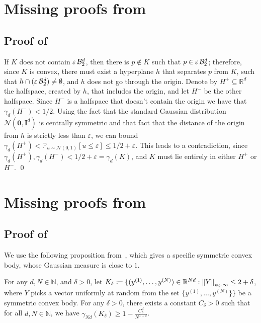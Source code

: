 \section{Missing proofs from }\label{app: missing from prelims}

\subsection{Proof of~}
    If $K$ does not contain $\varepsilon \, \mathcal{B}^d_2$, then there is $p \notin K$ such that $p \in \varepsilon \, \mathcal{B}^d_2$; therefore, since $K$ is convex, there must exist a hyperplane $h$ that separates $p$ from $K$, such that $h \cap (\varepsilon \, \mathcal{B}^d_2) \neq \emptyset$, and $h$ does not go through the origin. Denote by $H^+ \subseteq \mathbb{R}^d$ the halfspace, created by $h$, that includes the origin, and let $H^{-}$ be the other halfspace. Since $H^-$ is a halfspace that doesn't contain the origin we have that $\gamma_d(H^-) < 1/2$. Using the fact that the standard Gaussian distribution $\mathcal{N}(\mathbf{0}, \mathbf{I}^d)$ is centrally symmetric and that fact that the distance of the origin from $h$ is strictly less than $\varepsilon$, we can bound $\gamma_d(H^+) < \mathbb{P}_{u \sim \mathcal{N}(0,1)}[u \leq \varepsilon] \leq 1/2 + \varepsilon$. This leads to a contradiction, since $\gamma_d(H^+),\gamma_d(H^-) < 1/2 + \varepsilon = \gamma_d(K)$, and $K$ must lie entirely in either $H^+$ or $H^-$. \qed

\section{Missing proofs from }\label{app: missing from section 3}

\subsection{Proof of~}

We use the following proposition from~\cite{kulkarni2024optimal}, which gives a specific symmetric convex body, whose Gaussian measure is close to $1$.

\begin{proposition}\label{proposition:convex-body}
    For any $d, N \in \mathbb{N}$, and $\delta > 0$, let 
    $K_{\delta} \coloneqq \{ (y^{(1)}, \ldots, y^{(N)}) \in \mathbb{R}^{N d}: \left\lVert Y\right\rVert_{\psi_2,\infty} \leq 2 + \delta$, where $Y$ picks a vector uniformly at random from the set $\{y^{(1)}, \ldots, y^{(N)}\} \}$ be a symmetric convex body. For any $\delta > 0$, there exists a constant $C_{\delta} > 0$ such that for all $d,N \in \mathbb{N}$, we have $\gamma_{Nd}(K_\delta) \geq 1 - \frac{C_{\delta}^d}{N^{1+\delta}}$.
\end{proposition}



